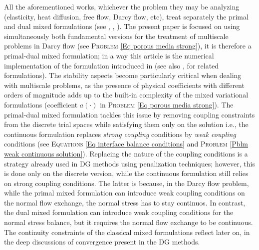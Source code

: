 \documentclass[3p]{elsarticle}
\begin{document}
All the aforementioned works, whichever the problem they may be analyzing (elasticity, heat diffusion, free flow, Darcy flow, etc), treat separately the primal and dual mixed formulations (see \cite{BrezziFortin}, \cite{GiraultRaviartNS}, \cite{RaviartThomas1977}). The present paper is focused on using simultaneously both fundamental versions for the treatment of multiscale problems in Darcy flow (see \textsc{Problem} \eqref{Eq porous media strong}), it is therefore a primal-dual mixed formulation; in a way this article is the numerical implementation of the formulation introduced in \cite{MoralesNaranjo} (see also \cite{MoralesShow2}, \cite{Morales2} for related formulations). The stability aspects become particularly critical when dealing with multiscale problems, as the presence of physical coefficients with different orders of magnitude adds up to the built-in complexity of the mixed variational formulations (coefficient $a(\cdot)$ in \textsc{Problem}  \eqref{Eq porous media strong}). The primal-dual mixed formulation tackles this issue by removing coupling constraints from the discrete trial spaces while satisfying them only on the solution i.e., the continuous formulation replaces \textit{strong coupling} conditions by \textit{weak coupling} conditions (see \textsc{Equations} \eqref{Eq interface balance conditions} and \textsc{Problem} \eqref{Pblm weak continuous solution}). Replacing the nature of the coupling conditions is a strategy already used in DG methods using penalization techniques; however, this is done only on the discrete version, while the continuous formulation still relies on strong coupling conditions. The latter is because, in the Darcy flow problem, while the primal mixed formulation can introduce weak coupling conditions on the normal flow exchange, the normal stress has to stay continuos. In contrast, the dual mixed formulation can introduce weak coupling conditions for the normal stress balance, but it requires the normal flow exchange to be continuous. The continuity constraints of the classical mixed formulations reflect later on, in the deep discussions of convergence present in the DG methods. 
\end{document}
